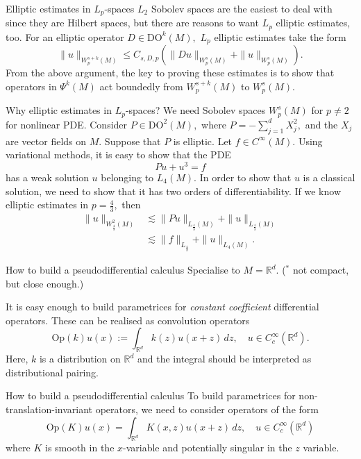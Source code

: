 \documentclass{beamer}
\numberwithin{equation}{section}
\theoremstyle{plain}
\theoremstyle{plain}
\theoremstyle{definition}
\theoremstyle{plain}
\theoremstyle{plain}
\theoremstyle{definition}
\newcommand{\Rl}{\mathbb{R}}
\newcommand{\Op}{\mathrm{Op}}
\begin{document}
\begin{frame}{Elliptic estimates in $L_p$-spaces}
    $L_2$ Sobolev spaces are the easiest to deal with since they are Hilbert spaces, but there are reasons to want $L_p$ elliptic estimates, too. For an elliptic operator $D\in \mathrm{DO}^k(M),$ $L_p$ elliptic estimates take the form
    \[
        \|u\|_{W^{s+k}_p(M)} \leq C_{s,D,p}(\|Du\|_{W^{s}_p(M)}+\|u\|_{W^{s}_p(M)}).
    \]
    \pause
    From the above argument, the key to proving these estimates is to show that operators in $\Psi^k(M)$ act boundedly from $W^{s+k}_p(M)$
    to $W^{s}_p(M).$
\end{frame}

\begin{frame}{Why elliptic estimates in $L_p$-spaces?}
    We need Sobolev spaces $W^s_p(M)$ for $p\neq 2$ for nonlinear PDE. 
    \pause
    Consider $P\in \mathrm{DO}^2(M),$ where $P = -\sum_{j=1}^d X_j^2,$ and the $X_j$ are vector fields on $M.$ Suppose that $P$ is elliptic.
    \pause
    Let $f \in C^\infty(M).$ Using variational methods, it is easy to show that the PDE
    \[
        Pu+u^3 = f
    \]
    has a weak solution $u$ belonging to $L_4(M).$ In order to show that $u$ is a classical solution, we need to show that it has two orders of differentiability.
    \pause
    If we know elliptic estimates in $p=\frac{4}{3},$ then
    \begin{align*}
        \|u\|_{W^2_{\frac{4}{3}}(M)} &\lesssim \|Pu\|_{L_{\frac{4}{3}}(M)}+\|u\|_{L_{\frac{4}{3}}(M)}\\
                                     &\lesssim \|f\|_{L_{\frac{4}{3}}}+\|u\|_{L_4(M)}.
    \end{align*}
\end{frame}

\begin{frame}{How to build a pseudodifferential calculus}
    Specialise to $M = \Rl^d.$ ($^*$ not compact, but close enough.)
    
    It is easy enough to build parametrices for \emph{constant coefficient} differential operators. These can be realised as convolution operators
    \[
        \Op(k)u(x) := \int_{\Rl^d} k(z)u(x+z)\,dz,\quad u\in C^\infty_c(\Rl^d).
    \]
    Here, $k$ is a distribution on $\Rl^d$ and the integral should be interpreted as distributional pairing.
\end{frame}

\begin{frame}{How to build a pseudodifferential calculus}
    To build parametrices for non-translation-invariant operators, we need to consider operators of the form
    \[
        \Op(K)u(x) = \int_{\Rl^d} K(x,z)u(x+z)\, dz,\quad u\in C^\infty_c(\Rl^d)
    \]
    where $K$ is smooth in the $x$-variable and potentially singular in the $z$ variable.
\end{frame}
\end{document}
